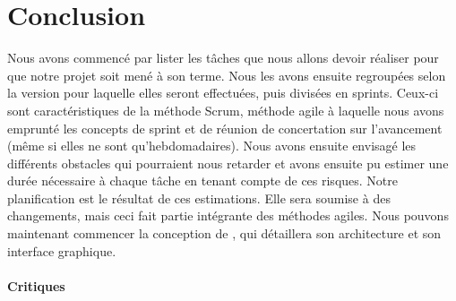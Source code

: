 \section{Conclusion}
	\label{sec:conclusion}




	Nous avons commencé par lister les tâches que nous allons devoir réaliser pour que notre projet soit mené à son terme. Nous les avons ensuite regroupées selon la version pour laquelle elles seront effectuées, puis divisées en sprints. Ceux-ci sont caractéristiques de la méthode Scrum, méthode agile à laquelle nous avons emprunté les concepts de sprint et de réunion de concertation sur l'avancement (même si elles ne sont qu'hebdomadaires). Nous avons ensuite envisagé les différents obstacles qui pourraient nous retarder et avons ensuite pu estimer une durée nécessaire à chaque tâche en tenant compte de ces risques. Notre planification est le résultat de ces estimations. Elle sera soumise à des changements, mais ceci fait partie intégrante des méthodes agiles. Nous pouvons maintenant commencer la conception de \glasir{}, qui détaillera son architecture et son interface graphique.
	\paragraph{Critiques}